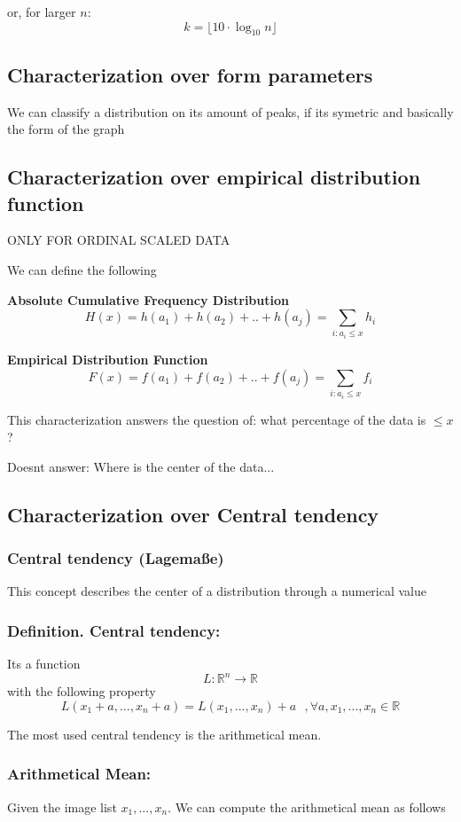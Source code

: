 \documentclass{article}
\begin{document}
or, for larger $n$:
\[
k = \lfloor 10 \cdot \log_{10}{n} \rfloor
\]
\subsection{Characterization over form parameters}
We can classify a distribution on its amount of peaks, if its symetric and basically the form of the graph

\subsection{Characterization over empirical distribution function}
ONLY FOR ORDINAL SCALED DATA

We can define the following

\textbf{Absolute Cumulative Frequency Distribution}
  \[H(x) = h(a_1)+ h(a_2) + ..+h(a_j) = \sum_{i:a_i\leq x}h_i\]

  \textbf{Empirical Distribution Function}
  \[F(x) = f(a_1)+ f(a_2) + ..+f(a_j) = \sum_{i:a_i\leq x}f_i\]

  This characterization answers the question of: what percentage of the data is $\leq x$?

  Doesnt answer: Where is the center of the data...

\subsection{Characterization over Central tendency}

\subsubsection{Central tendency (Lagemaße)}

This concept describes the center of a distribution through a numerical value

\subsubsection{Definition. Central tendency: }Its a function
\[L : \mathbb{R}^n \to \mathbb{R}\] with the following property
\[L(x_1 + a , ... , x_n +a ) = L (x_1,...,x_n) + a \text{    } ,  \forall a,x_1,...,x_n \in \mathbb{R}\]

The most used central tendency is the arithmetical mean.


\subsubsection{Arithmetical Mean: } Given the image list $x_1,...,x_n$. We can compute the arithmetical mean as follows
\end{document}
